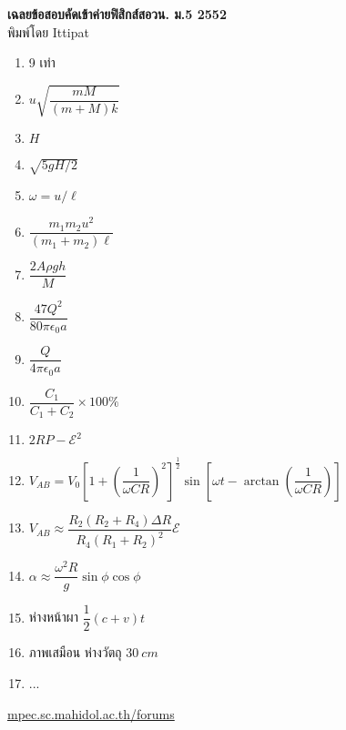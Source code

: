 \documentclass[a4paper,12pt]{article}
\begin{document}
\thispagestyle{empty}
\begin{center}
	{\huge \textbf{เฉลยข้อสอบคัดเข้าค่ายฟิสิกส์สอวน. ม.\textenglish{5} 2552}}\\
	พิมพ์โดย Ittipat\\
\end{center}
\begin{enumerate}
	\item 9 เท่า
	\item \(u \sqrt{\dfrac{mM}{(m+M)k}}\)
	\item \(H\)
	\item \(\sqrt{5gH/2}\)
	\item \(\omega = u/\ell\)
	\item \(\dfrac{m_1m_2u^2}{(m_1+m_2)\ell}\)
	\item \(\dfrac{2A\rho gh}{M}\)
	\item \(\dfrac{47Q^2}{80\pi \epsilon_{0}a}\)
	\item \(\dfrac{Q}{4\pi \epsilon_{0}a}\)
	\item \(\dfrac{C_1}{C_1+C_2}\times 100\%\)
	\item \(2RP - \mathcal{E}^2\)
	\item \(V_{AB}=V_0\left[ 1+\left (\dfrac{1}{\omega CR}\right )^2 \right]^{\frac{1}{2}}\sin \left [\omega t-\arctan\left (\dfrac{1}{\omega CR}\right ) \right ]\)
	\item \(V_{AB}\approx \dfrac{R_2(R_2+R_4)\Delta R}{R_4(R_1+R_2)^2}\mathcal{E}\)
	\item \(\alpha \approx \dfrac{\omega^2R}{g}\sin \phi \cos \phi\)
	\item ห่างหน้าผา \(\dfrac{1}{2}(c+v)t\)
	\item ภาพเสมือน ห่างวัตถุ \(\SI{30}{cm}\)
	\item ...
\end{enumerate}
\vfill	
\begin{center}
	\href{http://mpec.sc.mahidol.ac.th/forums/}{mpec.sc.mahidol.ac.th/forums}
\end{center}
\end{document}
